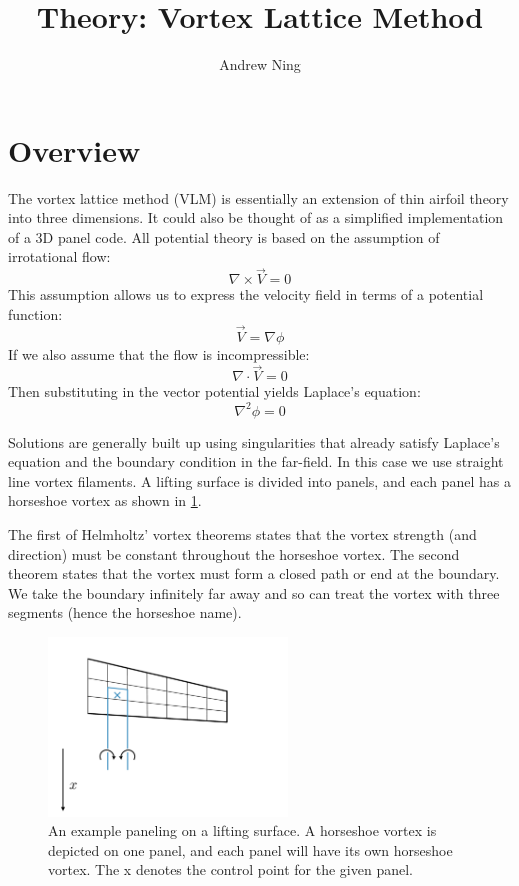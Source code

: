 \documentclass{article}
\begin{document}
\author{Andrew Ning}
\title{Theory: Vortex Lattice Method}
\maketitle

\section{Overview}

The vortex lattice method (VLM) is essentially an extension of thin airfoil theory into three dimensions.  It could also be thought of as a simplified implementation of a 3D panel code.  All potential theory is based on the assumption of irrotational flow: 
\begin{equation}
\nabla \times \vec{V} = 0
\end{equation}
This assumption allows us to express the velocity field in terms of a potential function:
\begin{equation}
\vec{V} = \nabla \phi
\end{equation}
If we also assume that the flow is incompressible:
\begin{equation}
\nabla \cdot \vec V = 0
\end{equation}
Then substituting in the vector potential yields Laplace's equation:
\begin{equation}
\nabla^2 \phi = 0
\end{equation}

Solutions are generally built up using singularities that already satisfy Laplace's equation and the boundary condition in the far-field.  In this case we use straight line vortex filaments.  A lifting surface is divided into panels, and each panel has a horseshoe vortex as shown in \cref{fig:horseshoe}.  

The first of Helmholtz' vortex theorems states that the vortex strength (and direction) must be constant throughout the horseshoe vortex.  The second theorem states that the vortex must form a closed path or end at the boundary.  We take the boundary infinitely far away and so can treat the vortex with three segments (hence the horseshoe name).  

\begin{figure}[htbp]
\centering
\includegraphics[width=2.5in]{figs/horseshoe}
\caption{An example paneling on a lifting surface. A horseshoe vortex is depicted on one panel, and each panel will have its own horseshoe vortex.  The x denotes the control point for the given panel.}
\label{fig:horseshoe}
\end{figure}
\end{document}
